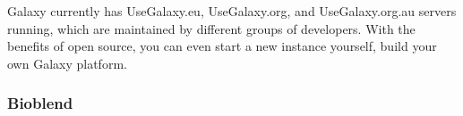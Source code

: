         Galaxy currently has UseGalaxy.eu, UseGalaxy.org, and UseGalaxy.org.au servers running, which are maintained by different groups of developers. With the benefits of open source, you can even start a new instance yourself, build your own Galaxy platform.

        \subsubsection{Bioblend}
        